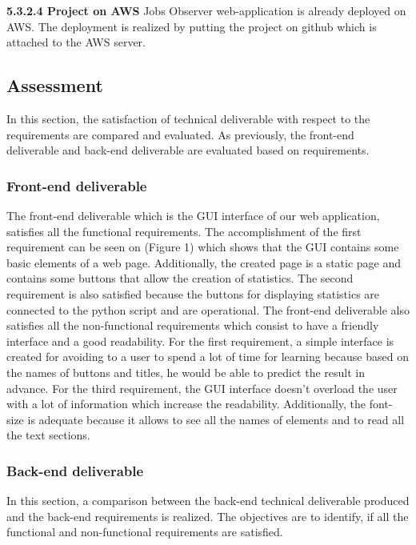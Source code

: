 \documentclass[conference,compsoc]{IEEEtran}
\begin{document}
\noindent
\newline\newline
\textbf{5.3.2.4 Project on AWS}
\newline\newline
Jobs Observer web-application is already deployed on AWS. The deployment is realized by putting the project on github which is attached to the AWS server. 

\subsection{Assessment}
In this section, the satisfaction of technical deliverable with respect to the requirements are compared and evaluated. As previously, the front-end deliverable and back-end deliverable are evaluated based on requirements. 

\subsubsection{Front-end deliverable}
The front-end deliverable which is the GUI interface of our web application, satisfies all the functional requirements. The accomplishment of the first requirement can be seen on (Figure 1) which shows that the GUI contains some basic elements of a web page. Additionally, the created page is a static page and contains some buttons that allow the creation of statistics.                                         
\newline
The second requirement is also satisfied because the buttons for displaying statistics are connected to the python script and are operational. 
The front-end deliverable also satisfies all the non-functional requirements which consist to have a friendly interface and a good readability. For the first requirement, a simple interface is created for avoiding to a user to spend a lot of time for learning because based on the names of buttons and titles, he would be able to predict the result in advance.
\newline                                                                                                     
For the third requirement, the GUI interface doesn't overload the user with a lot of information which increase the readability. Additionally, the font-size is adequate because it allows to see all the names of elements and to read all the text sections. 


\subsubsection{Back-end deliverable}
In this section, a comparison between the back-end technical deliverable produced and the back-end requirements is realized. The objectives are to identify, if all the functional and non-functional requirements are satisfied. 
\end{document}
